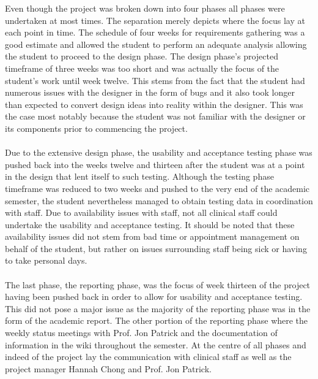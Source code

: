 \noindent Even though the project was broken down into four phases all phases were undertaken at most times. The separation merely depicts where the focus lay at each point in time. The schedule of four weeks for requirements gathering was a good estimate and allowed the student to perform an adequate analysis allowing the student to proceed to the design phase. The design phase's projected timeframe of three weeks was too short and was actually the focus of the student's work until week twelve. This stems from the fact that the student had numerous issues with the designer in the form of bugs and it also took longer than expected to convert design ideas into reality within the designer. This was the case most notably because the student was not familiar with the designer or its components prior to commencing the project.
\\ \\
Due to the extensive design phase, the usability and acceptance testing phase was pushed back into the weeks twelve and thirteen after the student was at a point in the design that lent itself to such testing. Although the testing phase timeframe was reduced to two weeks and pushed to the very end of the academic semester, the student nevertheless managed to obtain testing data in coordination with staff. Due to availability issues with staff, not all clinical staff could undertake the usability and acceptance testing. It should be noted that these availability issues did not stem from bad time or appointment management on behalf of the student, but rather on issues surrounding staff being sick or having to take personal days. 
\\ \\
The last phase, the reporting phase, was the focus of week thirteen of the project having been pushed back in order to allow for usability and acceptance testing. This did not pose a major issue as the majority of the reporting phase was in the form of the academic report. The other portion of the reporting phase where the weekly status meetings with Prof. Jon Patrick and the documentation of information in the wiki throughout the semester. At the centre of all phases and indeed of the project lay the communication with clinical staff as well as the project manager Hannah Chong and Prof. Jon Patrick.
